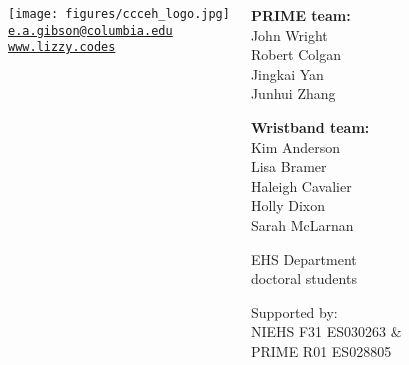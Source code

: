 \documentclass{beamer}
\begin{document}
{\begin{columns}
\vspace{-2em}

\begin{center}
\texttt{[image: figures/ccceh\_logo.jpg]} \\
\vspace{1ex}
\tiny
\href{mailto:e.a.gibson@columbia.edu}{\faEnvelopeO \hspace{0.25ex} \tt e.a.gibson@columbia.edu} \\
\href{http://www.lizzy.codes}{\faGlobe \hspace{0.5ex} \tt www.lizzy.codes}
\end{center}


\begin{flushright}
\scriptsize
{\color{matbluedark} \textbf{PRIME team:}} \\
            John Wright \\
            Robert Colgan \\
            Jingkai Yan \\
            Junhui Zhang \\

\vspace{5mm}

{\color{matbluedark} \textbf{Wristband team:}} \\
Kim Anderson \\
Lisa Bramer \\
Haleigh Cavalier \\
Holly Dixon \\
Sarah McLarnan \\

\vspace{5mm}

EHS Department \\ doctoral students

\vspace{5mm}

{\tiny\color{gray}Supported by: \\
NIEHS F31 ES030263 \& \\
PRIME R01 ES028805 \\
}

\end{flushright}

\end{columns}
}
\end{document}
